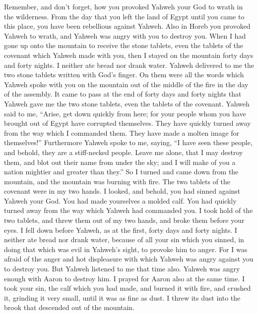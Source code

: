  Remember, and don't forget, how you provoked Yahweh your
God to wrath in the wilderness. From the day that you left the land of
Egypt until you came to this place, you have been rebellious against
Yahweh.  Also in Horeb you provoked Yahweh to wrath, and
Yahweh was angry with you to destroy you.  When I had gone
up onto the mountain to receive the stone tablets, even the tablets of
the covenant which Yahweh made with you, then I stayed on the mountain
forty days and forty nights. I neither ate bread nor drank water.
 Yahweh delivered to me the two stone tablets written
with God's finger. On them were all the words which Yahweh spoke with
you on the mountain out of the middle of the fire in the day of the
assembly.  It came to pass at the end of forty days and
forty nights that Yahweh gave me the two stone tablets, even the tablets
of the covenant.  Yahweh said to me, ``Arise, get down
quickly from here; for your people whom you have brought out of Egypt
have corrupted themselves. They have quickly turned away from the way
which I commanded them. They have made a molten image for themselves!''
 Furthermore Yahweh spoke to me, saying, ``I have seen
these people, and behold, they are a stiff-necked people.
 Leave me alone, that I may destroy them, and blot out
their name from under the sky; and I will make of you a nation mightier
and greater than they.''  So I turned and came down from
the mountain, and the mountain was burning with fire. The two tablets of
the covenant were in my two hands.  I looked, and behold,
you had sinned against Yahweh your God. You had made yourselves a molded
calf. You had quickly turned away from the way which Yahweh had
commanded you.  I took hold of the two tablets, and threw
them out of my two hands, and broke them before your eyes.
 I fell down before Yahweh, as at the first, forty days
and forty nights. I neither ate bread nor drank water, because of all
your sin which you sinned, in doing that which was evil in Yahweh's
sight, to provoke him to anger.  For I was afraid of the
anger and hot displeasure with which Yahweh was angry against you to
destroy you. But Yahweh listened to me that time also. 
Yahweh was angry enough with Aaron to destroy him. I prayed for Aaron
also at the same time.  I took your sin, the calf which
you had made, and burned it with fire, and crushed it, grinding it very
small, until it was as fine as dust. I threw its dust into the brook
that descended out of the mountain.

